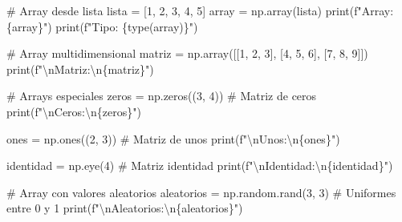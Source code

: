 \documentclass[
  doc,
  floatsintext,
  longtable,
  a4paper,
  nolmodern,
  notxfonts,
  notimes,
  12pt,
  colorlinks=true,linkcolor=blue,citecolor=blue,urlcolor=blue]{apa7}
\newenvironment{Shaded}{\begin{snugshade}}{\end{snugshade}}
\newcommand{\BuiltInTok}[1]{\textcolor[rgb]{0.00,0.23,0.31}{#1}}
\newcommand{\CharTok}[1]{\textcolor[rgb]{0.13,0.47,0.30}{#1}}
\newcommand{\CommentTok}[1]{\textcolor[rgb]{0.37,0.37,0.37}{#1}}
\newcommand{\DecValTok}[1]{\textcolor[rgb]{0.68,0.00,0.00}{#1}}
\newcommand{\NormalTok}[1]{\textcolor[rgb]{0.00,0.23,0.31}{#1}}
\newcommand{\OperatorTok}[1]{\textcolor[rgb]{0.37,0.37,0.37}{#1}}
\newcommand{\SpecialCharTok}[1]{\textcolor[rgb]{0.37,0.37,0.37}{#1}}
\newcommand{\SpecialStringTok}[1]{\textcolor[rgb]{0.13,0.47,0.30}{#1}}
\begin{document}
\begin{Shaded}
\begin{Highlighting}[]
\CommentTok{\# Array desde lista}
\NormalTok{lista }\OperatorTok{=}\NormalTok{ [}\DecValTok{1}\NormalTok{, }\DecValTok{2}\NormalTok{, }\DecValTok{3}\NormalTok{, }\DecValTok{4}\NormalTok{, }\DecValTok{5}\NormalTok{]}
\NormalTok{array }\OperatorTok{=}\NormalTok{ np.array(lista)}
\BuiltInTok{print}\NormalTok{(}\SpecialStringTok{f"Array: }\SpecialCharTok{\{}\NormalTok{array}\SpecialCharTok{\}}\SpecialStringTok{"}\NormalTok{)}
\BuiltInTok{print}\NormalTok{(}\SpecialStringTok{f"Tipo: }\SpecialCharTok{\{}\BuiltInTok{type}\NormalTok{(array)}\SpecialCharTok{\}}\SpecialStringTok{"}\NormalTok{)}

\CommentTok{\# Array multidimensional}
\NormalTok{matriz }\OperatorTok{=}\NormalTok{ np.array([[}\DecValTok{1}\NormalTok{, }\DecValTok{2}\NormalTok{, }\DecValTok{3}\NormalTok{], [}\DecValTok{4}\NormalTok{, }\DecValTok{5}\NormalTok{, }\DecValTok{6}\NormalTok{], [}\DecValTok{7}\NormalTok{, }\DecValTok{8}\NormalTok{, }\DecValTok{9}\NormalTok{]])}
\BuiltInTok{print}\NormalTok{(}\SpecialStringTok{f"}\CharTok{\textbackslash{}n}\SpecialStringTok{Matriz:}\CharTok{\textbackslash{}n}\SpecialCharTok{\{}\NormalTok{matriz}\SpecialCharTok{\}}\SpecialStringTok{"}\NormalTok{)}

\CommentTok{\# Arrays especiales}
\NormalTok{zeros }\OperatorTok{=}\NormalTok{ np.zeros((}\DecValTok{3}\NormalTok{, }\DecValTok{4}\NormalTok{))  }\CommentTok{\# Matriz de ceros}
\BuiltInTok{print}\NormalTok{(}\SpecialStringTok{f"}\CharTok{\textbackslash{}n}\SpecialStringTok{Ceros:}\CharTok{\textbackslash{}n}\SpecialCharTok{\{}\NormalTok{zeros}\SpecialCharTok{\}}\SpecialStringTok{"}\NormalTok{)}

\NormalTok{ones }\OperatorTok{=}\NormalTok{ np.ones((}\DecValTok{2}\NormalTok{, }\DecValTok{3}\NormalTok{))  }\CommentTok{\# Matriz de unos}
\BuiltInTok{print}\NormalTok{(}\SpecialStringTok{f"}\CharTok{\textbackslash{}n}\SpecialStringTok{Unos:}\CharTok{\textbackslash{}n}\SpecialCharTok{\{}\NormalTok{ones}\SpecialCharTok{\}}\SpecialStringTok{"}\NormalTok{)}

\NormalTok{identidad }\OperatorTok{=}\NormalTok{ np.eye(}\DecValTok{4}\NormalTok{)  }\CommentTok{\# Matriz identidad}
\BuiltInTok{print}\NormalTok{(}\SpecialStringTok{f"}\CharTok{\textbackslash{}n}\SpecialStringTok{Identidad:}\CharTok{\textbackslash{}n}\SpecialCharTok{\{}\NormalTok{identidad}\SpecialCharTok{\}}\SpecialStringTok{"}\NormalTok{)}

\CommentTok{\# Array con valores aleatorios}
\NormalTok{aleatorios }\OperatorTok{=}\NormalTok{ np.random.rand(}\DecValTok{3}\NormalTok{, }\DecValTok{3}\NormalTok{)  }\CommentTok{\# Uniformes entre 0 y 1}
\BuiltInTok{print}\NormalTok{(}\SpecialStringTok{f"}\CharTok{\textbackslash{}n}\SpecialStringTok{Aleatorios:}\CharTok{\textbackslash{}n}\SpecialCharTok{\{}\NormalTok{aleatorios}\SpecialCharTok{\}}\SpecialStringTok{"}\NormalTok{)}


\end{Highlighting}
\end{Shaded}
\end{document}
